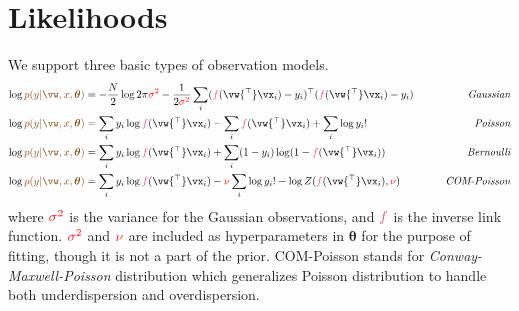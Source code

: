 \documentclass{article}
\newcounter{ct}
\newcommand{\trp}{{^\top}} %
\newcommand{\inverseLink}{\ensuremath{\textcolor{awesome}{f}}}
\newcommand{\weight}{\vw}
\newcommand{\hyp}{\bm{\theta}}
\newcommand{\likelihood}{\ensuremath{\textcolor{goldenbrown}{p(y|\weight,x,\hyp)}}}
\begin{document}
\section{Likelihoods}
We support three basic types of observation models.
\begin{align}
    \log\likelihood &= 
	-\frac{N}{2}\log2\pi\textcolor{red}{\sigma^2}
	- \frac{1}{2\textcolor{red}{\sigma^2}} 
	\sum_i
	    (\inverseLink(\weight\trp\vx_i) - y_i)\trp
	    (\inverseLink(\weight\trp\vx_i) - y_i) 
	\qquad 
	&\text{\it Gaussian}
    \label{eq:likelihood:Gaussian}
    \\
    \log\likelihood &= 
	\sum_i y_i \log \inverseLink(\weight\trp\vx_i)
	-
	\sum_i \inverseLink(\weight\trp\vx_i)
	+ \sum_i \log y_i!
	\qquad 
	&\text{\it Poisson}
    \label{eq:likelihood:Poisson}
    \\
    \log\likelihood &= 
	\sum_i
	y_i \log\inverseLink(\weight\trp\vx_i)
	+
	\sum_i
	(1-y_i) \log (1-\inverseLink(\weight\trp\vx_i))
	\qquad
	&\text{\it Bernoulli}
    \label{eq:likelihood:Bernoulli}
    \\
    \log\likelihood &= 
	\sum_i
	y_i \log\inverseLink(\weight\trp\vx_i) 
	- \textcolor{red}{\nu} \sum_i \log y_i!
	- \log Z(\inverseLink(\weight\trp\vx_i), \textcolor{red}{\nu})
	&\text{\it COM-Poisson}
    \label{eq:likelihood:COM}
\end{align}
where $\textcolor{red}{\sigma^2}$ is the variance for the Gaussian observations, and $\inverseLink$ is the inverse link function.
$\textcolor{red}{\sigma^2}$ and $\textcolor{red}{\nu}$ are included as hyperparameters in $\hyp$ for the purpose of fitting, though it is not a part of the prior.
COM-Poisson stands for {\it Conway-Maxwell-Poisson} distribution which generalizes Poisson distribution to handle both underdispersion and overdispersion.
\end{document}
